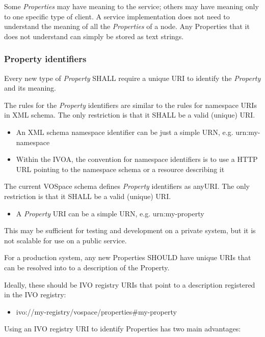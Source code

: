 \documentclass[11pt,a4paper]{ivoa}
\begin{document}
Some \emph{Properties} may have meaning to the service; others may have meaning only to one specific type of client. A service implementation does not need to understand the meaning of all the \emph{Properties} of a node. Any Properties that it does not understand can simply be stored as text strings.

\subsubsection{Property identifiers}
\label{subsubsec:property identifiers}
Every new type of \emph{Property} SHALL require a unique URI to identify the \emph{Property} and its meaning.

The rules for the \emph{Property} identifiers are similar to the rules for namespace URIs in XML schema. The only restriction is that it SHALL be a valid (unique) URI.

\begin{itemize}
    \item An XML schema namespace identifier can be just a simple URN, e.g. urn:my-namespace
    \item Within the IVOA, the convention for namespace identifiers is to use a HTTP URL pointing to the namespace schema or a resource describing it
\end{itemize}

The current VOSpace schema defines \emph{Property} identifiers as anyURI. The only restriction is that it SHALL be a valid (unique) URI.

\begin{itemize}
    \item A \emph{Property} URI can be a simple URN, e.g. urn:my-property
\end{itemize}

This may be sufficient for testing and development on a private system, but it is not scalable for use on a public service.

For a production system, any new Properties SHOULD have unique URIs that can be resolved into to a description of the Property.

Ideally, these should be IVO registry URIs that point to a description registered in the IVO registry:

\begin{itemize}
    \item ivo://my-registry/vospace/properties\#my-property
\end{itemize}

Using an IVO registry URI to identify Properties has two main advantages:
\end{document}
